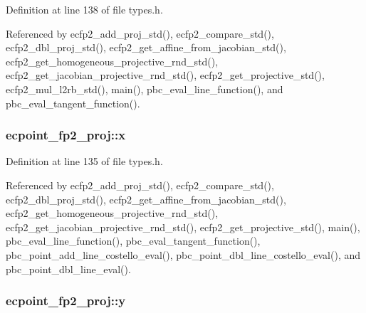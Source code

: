 Definition at line 138 of file types.\-h.



Referenced by ecfp2\-\_\-add\-\_\-proj\-\_\-std(), ecfp2\-\_\-compare\-\_\-std(), ecfp2\-\_\-dbl\-\_\-proj\-\_\-std(), ecfp2\-\_\-get\-\_\-affine\-\_\-from\-\_\-jacobian\-\_\-std(), ecfp2\-\_\-get\-\_\-homogeneous\-\_\-projective\-\_\-rnd\-\_\-std(), ecfp2\-\_\-get\-\_\-jacobian\-\_\-projective\-\_\-rnd\-\_\-std(), ecfp2\-\_\-get\-\_\-projective\-\_\-std(), ecfp2\-\_\-mul\-\_\-l2rb\-\_\-std(), main(), pbc\-\_\-eval\-\_\-line\-\_\-function(), and pbc\-\_\-eval\-\_\-tangent\-\_\-function().

\hypertarget{structecpoint__fp2__proj_a4707f5af2a353b0e19f633387295df0f}{
\subsubsection[{x}]{ ecpoint\-\_\-fp2\-\_\-proj\-::x}}\label{structecpoint__fp2__proj_a4707f5af2a353b0e19f633387295df0f}


Definition at line 135 of file types.\-h.



Referenced by ecfp2\-\_\-add\-\_\-proj\-\_\-std(), ecfp2\-\_\-compare\-\_\-std(), ecfp2\-\_\-dbl\-\_\-proj\-\_\-std(), ecfp2\-\_\-get\-\_\-affine\-\_\-from\-\_\-jacobian\-\_\-std(), ecfp2\-\_\-get\-\_\-homogeneous\-\_\-projective\-\_\-rnd\-\_\-std(), ecfp2\-\_\-get\-\_\-jacobian\-\_\-projective\-\_\-rnd\-\_\-std(), ecfp2\-\_\-get\-\_\-projective\-\_\-std(), main(), pbc\-\_\-eval\-\_\-line\-\_\-function(), pbc\-\_\-eval\-\_\-tangent\-\_\-function(), pbc\-\_\-point\-\_\-add\-\_\-line\-\_\-costello\-\_\-eval(), pbc\-\_\-point\-\_\-dbl\-\_\-line\-\_\-costello\-\_\-eval(), and pbc\-\_\-point\-\_\-dbl\-\_\-line\-\_\-eval().

\hypertarget{structecpoint__fp2__proj_a8bcf77075820297a0fa4d279b4c6ac2c}{
\subsubsection[{y}]{ ecpoint\-\_\-fp2\-\_\-proj\-::y}}\label{structecpoint__fp2__proj_a8bcf77075820297a0fa4d279b4c6ac2c}


